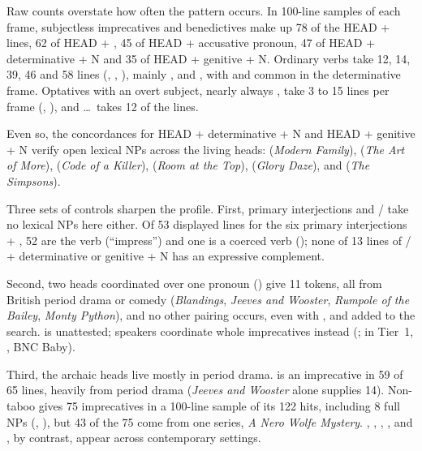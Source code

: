 \documentclass[12pt]{article}
\begin{document}
Raw counts overstate how often the pattern occurs. In 100-line samples of each frame, subjectless imprecatives and benedictives make up 78 of the HEAD +  lines, 62 of HEAD + , 45 of HEAD + accusative pronoun, 47 of HEAD + determinative + N and 35 of HEAD + genitive + N. Ordinary verbs take 12, 14, 39, 46 and 58 lines (, , ), mainly ,  and , with  and  common in the determinative frame. Optatives with an overt subject, nearly always , take 3 to 15 lines per frame (, ), and \dots\ takes 12 of the  lines.

Even so, the concordances for HEAD + determinative + N and HEAD + genitive + N verify open lexical NPs across the living heads:  (\emph{Modern Family}),  (\emph{The Art of More}),  (\emph{Code of a Killer}),  (\emph{Room at the Top}),  (\emph{Glory Daze}), and  (\emph{The Simpsons}).

Three sets of controls sharpen the profile. First, primary interjections and / take no lexical NPs here either. Of 53 displayed lines for the six primary interjections + , 52 are the verb  (\enquote{impress}) and one is a coerced verb (); none of 13 lines of / + determinative or genitive + N has an expressive complement.

Second, two heads coordinated over one pronoun () give 11 tokens, all from British period drama or comedy (\emph{Blandings}, \emph{Jeeves and Wooster}, \emph{Rumpole of the Bailey}, \emph{Monty Python}), and no other pairing occurs, even with ,  and  added to the search.  is unattested; speakers coordinate whole imprecatives instead (; in Tier~1, , BNC Baby).

Third, the archaic heads live mostly in period drama.  is an imprecative in 59 of 65 lines, heavily from period drama (\emph{Jeeves and Wooster} alone supplies 14). Non-taboo  gives 75 imprecatives in a 100-line sample of its 122 hits, including 8 full NPs (, ), but 43 of the 75 come from one series, \emph{A Nero Wolfe Mystery}. , , , ,  and , by contrast, appear across contemporary settings.
\end{document}
